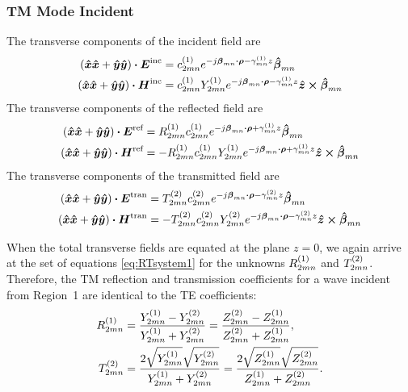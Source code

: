 \subsubsection{TM Mode Incident}
The transverse components of the incident field are
\begin{subequations}
  \begin{align}
    (\x\x + \y\y) \bdot \E\inc &= c\one_{2mn}
    e^{-j\vecbeta_{mn}\bdot\vecrho - \gamma\one_{mn} z} 
    \betahat_{mn} \\
    (\x\x + \y\y) \bdot \H\inc &= c\one_{2mn} Y\one_{2mn}
    e^{-j\vecbeta_{mn}\bdot\vecrho - \gamma\one_{mn} z} 
    \z\cross\betahat_{mn}
  \end{align}
\end{subequations}
The transverse components of the reflected field are
\begin{subequations}
  \begin{align}
    (\x\x + \y\y) \bdot \E\refl &= R\one_{2mn} c\one_{2mn}
    e^{-j\vecbeta_{mn}\bdot\vecrho + \gamma\one_{mn} z} 
    \betahat_{mn} \\
    (\x\x + \y\y) \bdot \H\refl &= -R\one_{2mn} c\one_{2mn} Y\one_{2mn}
    e^{-j\vecbeta_{mn}\bdot\vecrho + \gamma\one_{mn} z} 
    \z\cross\betahat_{mn}
  \end{align}
\end{subequations}
The transverse components of the transmitted field are
\begin{subequations}
  \begin{align}
    (\x\x + \y\y) \bdot \E\trans &= T\two_{2mn} c\two_{2mn}
    e^{-j\vecbeta_{mn}\bdot\vecrho - \gamma\two_{mn} z} 
    \betahat_{mn} \\
    (\x\x + \y\y) \bdot \H\trans &= -T\two_{2mn} c\two_{2mn} Y\two_{2mn}
    e^{-j\vecbeta_{mn}\bdot\vecrho - \gamma\two_{mn} z} 
    \z\cross\betahat_{mn}
  \end{align}
\end{subequations}

When the total transverse fields are equated at the plane $z=0$, we
again arrive at the set of equations \eqref{eq:RTsystem1}
for the unknowns $R\one_{2mn}$ and $T\two_{2mn}$.  Therefore, the TM
reflection and transmission coefficients for a wave incident from
Region~1 are identical to the TE coefficients:
\begin{align}
  R\one_{2mn} &= 
  \frac{Y\one_{2mn} - Y\two_{2mn}}{Y\one_{2mn} + Y\two_{2mn}} 
  = \frac{Z\two_{2mn} - Z\one_{2mn}}{Z\two_{2mn} + Z\one_{2mn}}, \\
   T\two_{2mn} &= 
   \frac{2\sqrt{Y\one_{2mn}}\sqrt{Y\two_{2mn}}}{Y\one_{2mn}+Y\two_{2mn}}
  = \frac{2\sqrt{Z\one_{2mn}}\sqrt{Z\two_{2mn}}}{Z\one_{2mn}+Z\two_{2mn}}.
\end{align}


